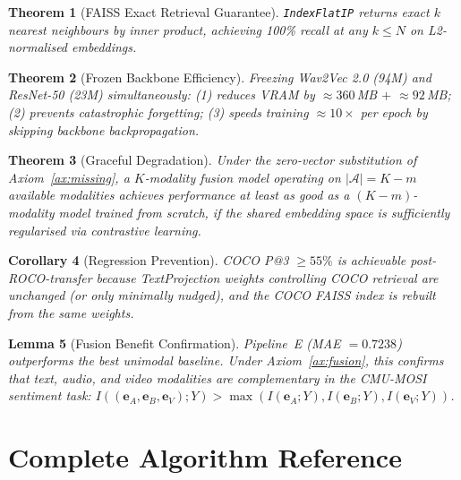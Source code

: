 \documentclass[12pt,a4paper]{article}
\theoremstyle{definition}
\theoremstyle{plain}
\newtheorem{theorem}{Theorem}[section]
\newtheorem{lemma}[theorem]{Lemma}
\newtheorem{corollary}[theorem]{Corollary}
\theoremstyle{remark}
\newcommand{\eA}{\mathbf{e}_A}
\newcommand{\eB}{\mathbf{e}_B}
\begin{document}
\begin{theorem}[FAISS Exact Retrieval Guarantee]
\texttt{IndexFlatIP} returns exact $k$ nearest neighbours by inner product, achieving 100\% recall at any $k \le N$ on L2-normalised embeddings.
\end{theorem}

\begin{theorem}[Frozen Backbone Efficiency]
Freezing Wav2Vec 2.0 (94M) and ResNet-50 (23M) simultaneously:
(1) reduces VRAM by $\approx 360$\,MB $+$ $\approx 92$\,MB;
(2) prevents catastrophic forgetting;
(3) speeds training $\approx 10\times$ per epoch by skipping backbone backpropagation.
\end{theorem}

\begin{theorem}[Graceful Degradation]
Under the zero-vector substitution of Axiom~\ref{ax:missing}, a $K$-modality fusion model operating on $|\mathcal{A}| = K - m$ available modalities achieves performance at least as good as a $(K-m)$-modality model trained from scratch, if the shared embedding space is sufficiently regularised via contrastive learning.
\end{theorem}

\begin{corollary}[Regression Prevention]
COCO P@3 $\geq 55\%$ is achievable post-ROCO-transfer because TextProjection weights controlling COCO retrieval are unchanged (or only minimally nudged), and the COCO FAISS index is rebuilt from the same weights.
\end{corollary}

\begin{lemma}[Fusion Benefit Confirmation]
Pipeline~E (MAE $= 0.7238$) outperforms the best unimodal baseline. Under Axiom~\ref{ax:fusion}, this confirms that text, audio, and video modalities are complementary in the CMU-MOSI sentiment task: $I((\eA, \eB, \mathbf{e}_V); Y) > \max(I(\eA; Y), I(\eB; Y), I(\mathbf{e}_V; Y))$.
\end{lemma}

\newpage
\section{Complete Algorithm Reference}
\end{document}
